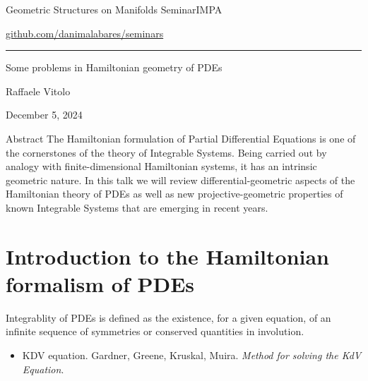 


\begin{minipage}{\textwidth}
	\begin{minipage}{1\textwidth}
		Geometric Structures on Manifolds Seminar\hfill IMPA
		
		{\small\hfill\href{https://github.com/danimalabares/seminars}{github.com/danimalabares/seminars}}
		
	\end{minipage}
\end{minipage}\vspace{.2cm}\hrule
\vspace{10pt}

{\Huge Some problems in Hamiltonian geometry of PDEs}

\hfill{\Large Raffaele Vitolo}

\hfill{\large December 5, 2024}

\begin{thing4}{Abstract}\leavevmode
The Hamiltonian formulation of Partial Differential Equations is one of the cornerstones of the theory of Integrable Systems. Being carried out by analogy with finite-dimensional Hamiltonian systems, it has an intrinsic geometric nature. In this talk we will review differential-geometric aspects of the Hamiltonian theory of PDEs as well as new projective-geometric properties of known Integrable Systems that are emerging in recent years.
\end{thing4}

\tableofcontents

\section{Introduction to the Hamiltonian formalism of PDEs}

Integrablity of PDEs is defined as the existence, for a given equation, of an infinite sequence of symmetries or conserved quantities in involution.

\begin{itemize}
\item KDV equation. Gardner, Greene, Kruskal, Muira. \textit{Method for solving the KdV Equation}. 
\end{itemize}

